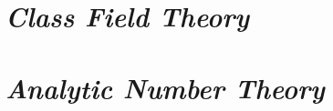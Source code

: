 \documentclass[10pt, a4paper]{book}
\begin{document}
\maketitle
\makecontents




\part{\emph{Class Field Theory}}



\part{\emph{Analytic Number Theory}}

\end{document}
